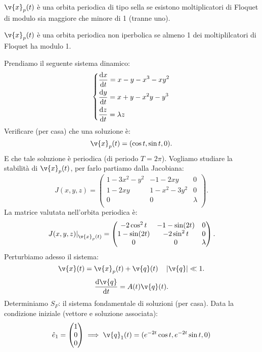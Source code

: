 \noindent
\begin{defn}[Selle]
    $\v{x}_p(t)$ è una orbita periodica di tipo sella se esistono moltiplicatori di Floquet di modulo sia maggiore che minore di 1 (tranne uno).
\end{defn}
\noindent
\begin{defn}
    $\v{x}_p(t)$ è una orbita periodica non iperbolica se almeno 1 dei moltiplilcatori di Floquet ha modulo 1.
\end{defn}
\noindent
\begin{exmp}[]
    Prendiamo il seguente sistema dinamico:
    \[
    \begin{dcases}
    \frac{\text{d} x}{\text{d} t} = x-y-x^3-xy^2\\
    \frac{\text{d} y}{\text{d} t} = x + y - x^2y-y^3\\
    \frac{\text{d} z}{\text{d} t} = \lambda z
    \end{dcases}
    \]
    Verificare (per casa) che una soluzione è:
    \[
	\v{x}_p(t) = (\cos t, \sin t, 0)
    .\] 
    E che tale soluzione è periodica (di periodo $T = 2\pi$). Vogliamo studiare la stabilità di $\v{x}_p(t) $, per farlo partiamo dalla Jacobiana:
    \[
	J(x, y, z) = 
	\begin{pmatrix}
	    1-3x^2 -y^2 & -1-2xy  & 0 \\
	    1-2xy & 1-x^2-3y^2 & 0 \\
	    0 & 0 & \lambda \\
	\end{pmatrix}
    .\] 
    La matrice valutata nell'orbita periodica è:
    \[
	\left.J(x, y, z)\right|_{\v{x}_p(t) }=
	   \begin{pmatrix}
	       -2\cos^2t & -1-\sin (2t)  & 0 \\
	       1-\sin (2t)  & -2\sin^2t & 0 \\
	       0 & 0 & \lambda \\
	   \end{pmatrix}
    .\] 
    Perturbiamo adesso il sistema:
    \[
	\v{x}(t) = \v{x}_p(t) + \v{ q}(t) \quad  \left|\v{ q}\right|\ll 1
    .\] 
    \[
	\frac{\text{d} \v{q }}{\text{d} t} = A(t) \v{ q}(t) 
    .\] 
    Determiniamo $S_F$: il sistema fondamentale di soluzioni (per casa). Data la condizione iniziale (vettore e soluzione associata):
    \[
	\hat{e}_1 = \begin{pmatrix} 1 \\ 0 \\ 0 \end{pmatrix} \implies  \v{q}_1(t) = (e^{-2t}\cos t, e^{-2t}\sin t, 0)
\]
\end{exmp}
